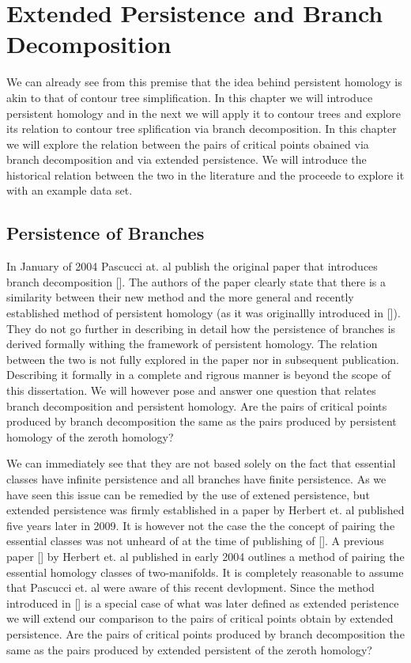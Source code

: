 \chapter{Extended Persistence and Branch Decomposition}
\label{chapter6}

We can already see from this premise that the idea behind persistent homology is akin to that of contour tree simplification. In this chapter we will introduce persistent homology and in the next we will apply it to contour trees and explore its relation to contour tree splification via branch decomposition. In this chapter we will explore the relation between the pairs of critical points obained via branch decomposition and via extended persistence. We will introduce the historical relation between the two in the literature and the proceede to explore it with an example data set.

\section{Persistence of Branches}

In January of 2004 Pascucci at. al publish the original paper that introduces branch decomposition []. The authors of the paper clearly state that there is a similarity between their new method and the more general and recently established method of persistent homology (as it was originallly introduced in []). They do not go further in describing in detail how the persistence of branches is derived formally withing the framework of persistent homology. The relation between the two is not fully explored in the paper nor in subsequent publication. Describing it formally in a complete and rigrous manner is beyond the scope of this dissertation. We will however pose and answer one question that relates branch decomposition and persistent homology. Are the pairs of critical points produced by branch decomposition the same as the pairs produced by persistent homology of the zeroth homology?

We can immediately see that they are not based solely on the fact that essential classes have infinite persistence and all branches have finite persistence. As we have seen this issue can be remedied by the use of extened persistence, but extended persistence was firmly established in a paper by Herbert et. al published five years later in 2009. It is however not the case the the concept of pairing the essential classes was not unheard of at the time of publishing of []. A previous paper [] by Herbert et. al published in early 2004 outlines a method of pairing the essential homology classes of two-manifolds. It is completely reasonable to assume that Pascucci et. al were aware of this recent devlopment. Since the method introduced in [] is a special case of what was later defined as extended peristence we will extend our comparison to the pairs of critical points obtain by extended persistence. Are the pairs of critical points produced by branch decomposition the same as the pairs produced by extended persistent of the zeroth homology?

